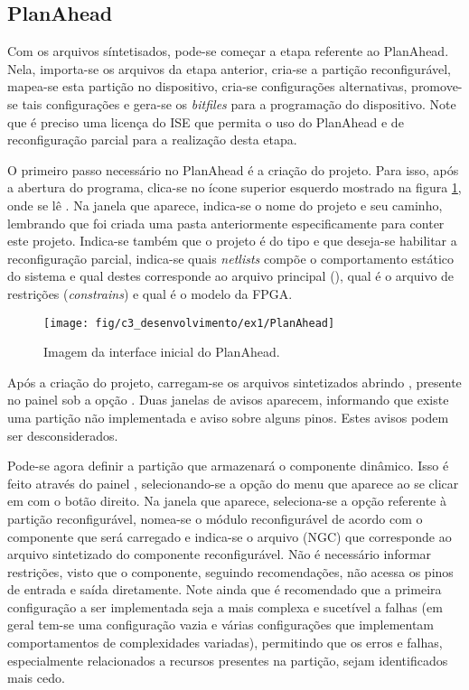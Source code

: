 \documentclass[11pt,a4paper,oneside]{book}
\begin{document}
\subsection{PlanAhead}
Com os arquivos síntetisados, pode-se começar a etapa referente ao PlanAhead.
Nela, importa-se os arquivos da etapa anterior, cria-se a partição reconfigurável, mapea-se esta partição no dispositivo, cria-se configurações alternativas, promove-se tais configurações e gera-se os \textit{bitfiles} para a programação do dispositivo.
Note que é preciso uma licença do ISE que permita o uso do PlanAhead e de reconfiguração parcial para a realização desta etapa.

O primeiro passo necessário no PlanAhead é a criação do projeto.
Para isso, após a abertura do programa, clica-se no ícone superior esquerdo mostrado na figura \ref{fig:ex1:planahead}, onde se lê .
Na janela que aparece, indica-se o nome do projeto e seu caminho, lembrando que foi criada uma pasta anteriormente especificamente para conter este projeto.
Indica-se também que o projeto é do tipo  e que deseja-se habilitar a reconfiguração parcial, indica-se quais \textit{netlists} compõe o comportamento estático do sistema e qual destes corresponde ao arquivo principal (), qual é o arquivo de restrições (\textit{constrains}) e qual é o modelo da FPGA.

\begin{figure}[h]
\centering
\texttt{[image: fig/c3\_desenvolvimento/ex1/PlanAhead]}
\caption{Imagem da interface inicial do PlanAhead.}
\label{fig:ex1:planahead}
\end{figure}

Após a criação do projeto, carregam-se os arquivos sintetizados abrindo , presente no painel  sob a opção .
Duas janelas de avisos aparecem, informando que existe uma partição não implementada e aviso sobre alguns pinos.
Estes avisos podem ser desconsiderados.

Pode-se agora definir a partição que armazenará o componente dinâmico.
Isso é feito através do painel , selecionando-se a opção  do menu que aparece ao se clicar em  com o botão direito.
Na janela que aparece, seleciona-se a opção referente à partição reconfigurável, nomea-se o módulo reconfigurável de acordo com o componente que será carregado e indica-se o arquivo (NGC) que corresponde ao arquivo sintetizado do componente reconfigurável.
Não é necessário informar restrições, visto que o componente, seguindo recomendações, não acessa os pinos de entrada e saída diretamente.
Note ainda que é recomendado que a primeira configuração a ser implementada seja a mais complexa e sucetível a falhas (em geral tem-se uma configuração vazia e várias configurações que implementam comportamentos de complexidades variadas), permitindo que os erros e falhas, especialmente relacionados a recursos presentes na partição, sejam identificados mais cedo.
\end{document}

